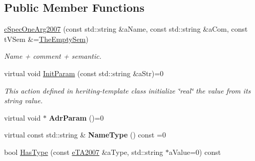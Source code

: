 \subsection*{Public Member Functions}
\begin{DoxyCompactItemize}
\item 
\hyperlink{classMMVII_1_1cSpecOneArg2007_a5325eac85f4f6d50eeb8ec78baf5026f}{c\+Spec\+One\+Arg2007} (const std\+::string \&a\+Name, const std\+::string \&a\+Com, const t\+V\+Sem \&=\hyperlink{classMMVII_1_1cSpecOneArg2007_a1e591f6be45029be7a657fabb4557208}{The\+Empty\+Sem})\hypertarget{classMMVII_1_1cSpecOneArg2007_a5325eac85f4f6d50eeb8ec78baf5026f}{}\label{classMMVII_1_1cSpecOneArg2007_a5325eac85f4f6d50eeb8ec78baf5026f}

\begin{DoxyCompactList}\small\item\em Name + comment + semantic. \end{DoxyCompactList}\item 
virtual void \hyperlink{classMMVII_1_1cSpecOneArg2007_a04b7f9f4aad6a9565c7bfc9a8041b025}{Init\+Param} (const std\+::string \&a\+Str)=0\hypertarget{classMMVII_1_1cSpecOneArg2007_a04b7f9f4aad6a9565c7bfc9a8041b025}{}\label{classMMVII_1_1cSpecOneArg2007_a04b7f9f4aad6a9565c7bfc9a8041b025}

\begin{DoxyCompactList}\small\item\em This action defined in heriting-\/template class initialize \char`\"{}real\char`\"{} the value from its string value. \end{DoxyCompactList}\item 
virtual void $\ast$ {\bfseries Adr\+Param} ()=0\hypertarget{classMMVII_1_1cSpecOneArg2007_a25923c98de44820af938c46b977cc534}{}\label{classMMVII_1_1cSpecOneArg2007_a25923c98de44820af938c46b977cc534}

\item 
virtual const std\+::string \& {\bfseries Name\+Type} () const =0\hypertarget{classMMVII_1_1cSpecOneArg2007_a8d9040c52df90d042bae987ab321f509}{}\label{classMMVII_1_1cSpecOneArg2007_a8d9040c52df90d042bae987ab321f509}

\item 
bool \hyperlink{classMMVII_1_1cSpecOneArg2007_a83a950c340e24f33fa75da723915110c}{Has\+Type} (const \hyperlink{MMVII__enums_8h_a9d431a971072a6c440012f6325f616ad}{e\+T\+A2007} \&a\+Type, std\+::string $\ast$a\+Value=0) const \hypertarget{classMMVII_1_1cSpecOneArg2007_a83a950c340e24f33fa75da723915110c}{}\label{classMMVII_1_1cSpecOneArg2007_a83a950c340e24f33fa75da723915110c}


\end{DoxyCompactItemize}
